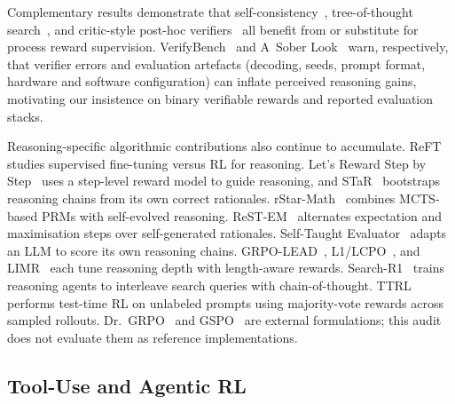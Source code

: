 Complementary results demonstrate that
self-consistency~\cite{wang2023selfconsistency}, tree-of-thought
search~\cite{yao2024tot}, and critic-style post-hoc
verifiers~\cite{mcaleese2024criticgpt} all benefit from or substitute for
process reward supervision. VerifyBench~\cite{zhang2025verifybench} and
A~Sober Look~\cite{hochlehnert2025sober} warn, respectively, that verifier
errors and evaluation artefacts (decoding, seeds, prompt format, hardware and
software configuration) can inflate perceived reasoning gains, motivating our
insistence on binary verifiable rewards and reported evaluation stacks.

Reasoning-specific algorithmic contributions also continue to accumulate.
ReFT~\cite{luong2024reft} studies supervised fine-tuning versus RL for
reasoning. Let's Reward Step by Step~\cite{zhang2025rewardstep} uses a step-level
reward model to guide reasoning, and STaR~\cite{zelikman2022star}
bootstraps reasoning chains from its own correct rationales. rStar-Math~\cite{guan2025rstarmath} combines MCTS-based PRMs
with self-evolved reasoning. ReST-EM~\cite{singh2024restem} alternates
expectation and maximisation steps over self-generated rationales.
Self-Taught Evaluator~\cite{wang2024stevaluator} adapts an LLM to score its
own reasoning chains. GRPO-LEAD~\cite{lu2025grpolead}, L1/LCPO~\cite{lu2025lcpo},
and LIMR~\cite{li2025limr} each tune reasoning depth with length-aware
rewards. Search-R1~\cite{jin2025searchr1} trains reasoning agents to
interleave search queries with chain-of-thought. TTRL~\cite{pu2025ttrl}
performs test-time RL on unlabeled prompts using majority-vote rewards across
sampled rollouts. Dr.~GRPO~\cite{tong2025drgrpo} and GSPO~\cite{qwen2025gspo} are external
formulations; this audit does not evaluate them as reference implementations.

\subsection{Tool-Use and Agentic RL}
\label{sec:related:tooluse}

